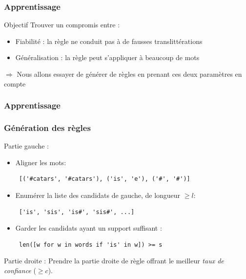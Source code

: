 \documentclass{beamer}
\begin{document}
\begin{frame}
	\frametitle{Apprentissage}

	\begin{block}{Objectif}
	Trouver un compromis entre :
		\begin{itemize}
		\item Fiabilité : la règle ne conduit pas à de fausses translittérations
		\item Généralisation : la règle peut s'appliquer à beaucoup de mots
		\end{itemize}			
	\end{block}

	\begin{alertblock}{}
	$\Longrightarrow$ Nous allons essayer de générer de règles en prenant ces deux paramètres en compte
	\end{alertblock}
\end{frame}

\begin{frame}[fragile]
\frametitle{Apprentissage}
\frametitle{Génération des règles}

	\begin{block}{Partie gauche :}
	 	\begin{itemize}
	 	\item Aligner les mots:
            {\scriptsize \begin{verbatim} [('#catars', '#catars'), ('is', 'e'), ('#', '#')] \end{verbatim}}
	 	\item Enumérer la liste des candidats de gauche, de longueur $\geq l$:
            {\scriptsize \begin{verbatim} ['is', 'sis', 'is#', 'sis#', ...] \end{verbatim}}
	 	\item Garder les candidats ayant un support suffisant :
            {\scriptsize \begin{verbatim} len([w for w in words if 'is' in w]) >= s \end{verbatim}}
		\end{itemize}
	\end{block}
	
	\begin{block}{Partie droite :}
        Prendre la partie droite de règle offrant le meilleur \emph{taux de confiance} ($\geq c$).
	\end{block}		
\end{frame}
\end{document}
